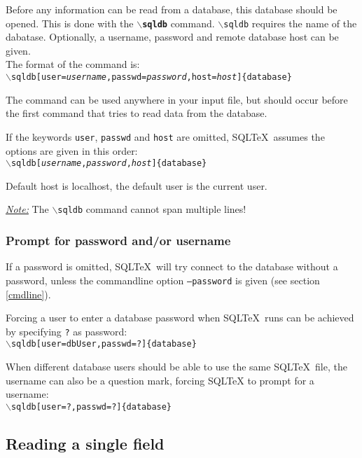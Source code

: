 \documentclass{article}
\newcommand{\bs}{\ensuremath{\backslash}}
\newcommand{\vs}{\vspace{3mm}}
\begin{document}
Before any information can be read from a database, this database should be opened.
This is done with the \texttt{\textbf{\bs sqldb}} command.
\texttt{\bs sqldb} requires the name of the dabatase. Optionally, a username, password and remote database host can be given. \\
The format of the command is:\\
\texttt{\bs sqldb[user=\textit{username},passwd=\textit{password},host=\textit{host}]\{database\}}

The command can be used anywhere in your input file, but should occur before the first command that tries to
read data from the database.

\vs

If the keywords \texttt{user}, \texttt{passwd} and \texttt{host} are omitted, SQL\TeX\ assumes the options are given in
this order:\\
\texttt{\bs sqldb[\textit{username},\textit{password},\textit{host}]\{database\}}

Default host is localhost, the default user is the current user.

\vs

\noindent\hspace{-3mm}\textit{\underline{Note:}} The \texttt{\bs sqldb} command cannot span multiple lines!

\subsubsection{Prompt for password and/or username}

If a password is omitted, SQL\TeX\ will try connect to the database without a password, unless the commandline option \texttt{--password} is given (see section \ref{cmdline}).

\vs 

Forcing a user to enter a database password when SQL\TeX\ runs can be achieved by specifying \texttt{?} as password:\\
\texttt{\bs sqldb[user=dbUser,passwd=?]\{database\}}

\vs

When different database users should be able to use the same SQL\TeX\ file, the username can also be a question mark, forcing SQL\TeX
to prompt for a username:\\
\texttt{\bs sqldb[user=?,passwd=?]\{database\}}

\subsection{Reading a single field}\label{sqlfield}
\end{document}

